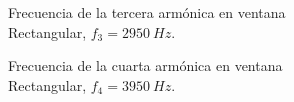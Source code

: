 \begin{figure}[H]
\begin{subfigure}[H]{0.48\textwidth}
        \end{subfigure}
        \begin{subfigure}[H]{0.48\textwidth}
          \caption{Frecuencia de la tercera armónica en ventana Rectangular, $f_{3}=2950~Hz$.}
        \end{subfigure}
       \hfill
        \begin{subfigure}[H]{0.48\textwidth}
          \caption{Frecuencia de la cuarta armónica en ventana Rectangular, $f_{4}=3950~Hz$.}
        \end{subfigure}
        \begin{subfigure}[H]{0.48\textwidth}

\end{subfigure}
\end{figure}
